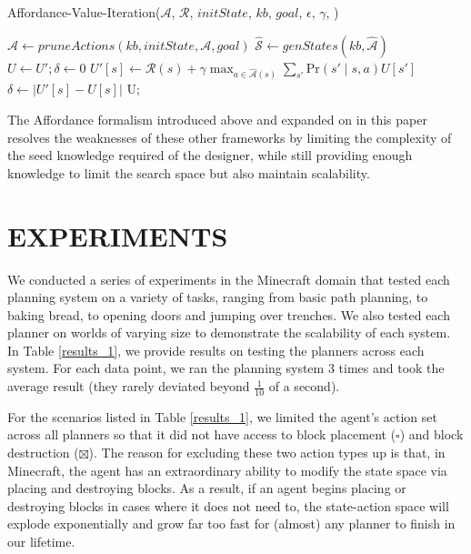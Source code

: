 \documentclass[]{article}
\begin{document}
\begin{algorithm}
  \caption{Affordance-Value-Iteration($\mathcal{A}$, $\mathcal{R}$, $initState$, $kb$, $goal$, $\epsilon$, $\gamma$, )}
  \begin{algorithmic}[1]
    \State $\hat{\mathcal{A}} \gets pruneActions(kb, initState, \mathcal{A}, goal)$
    \State $\hat{\mathcal{S}} \gets genStates(kb, \hat{\mathcal{A}})$
    \State $U \gets U';\delta \gets 0$
    \State $U'[s] \leftarrow \mathcal{R}(s) + \gamma \max_{a \in \hat{\mathcal{A}}(s)} \sum_{s'} \text{Pr}(s'\mid s,a) U[s']$
    	\State $\delta \gets |U'[s] - U[s]|$ 
    \EndIf
    \EndFor
    \EndWhile
    \Return U;
  \end{algorithmic}
  \label{alg:vi}
\end{algorithm}


The Affordance formalism introduced above and expanded on in this 
paper resolves the weaknesses of these other frameworks by limiting 
the complexity of the seed knowledge required of the designer, while 
still providing enough knowledge to limit the search space but also 
maintain scalability.

\section{EXPERIMENTS}

We conducted a series of experiments in the Minecraft domain that tested 
each planning system on a variety of tasks, ranging from basic path planning,
 to baking bread, to opening doors and jumping over trenches.  We also tested 
 each planner on worlds of varying size to demonstrate the scalability of each 
 system. In Table \ref{results_1}, we provide results on testing the planners 
 across each system. For each data point, we ran the planning system 3 times 
 and took the average result (they rarely deviated beyond $\frac{1}{10}$ of a second).

For the scenarios listed in Table \ref{results_1}, we limited the agent's 
action set across all planners so that it did not have access to block 
placement ($\square$) and block destruction ($\boxtimes$). The reason 
for excluding these two action types up is that, in Minecraft, the agent 
has an extraordinary ability to modify the state space via placing and 
destroying blocks. As a result, if an agent begins placing or destroying 
blocks in cases where it does not need to, the state-action space will 
explode exponentially and grow far too fast for (almost) any planner to 
finish in our lifetime. 
\end{document}
